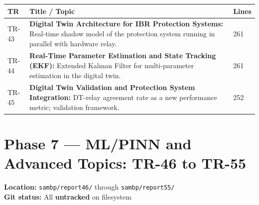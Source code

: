 \documentclass[11pt,a4paper]{article}
\begin{document}
\begin{longtable}{lp{9.5cm}l}
\toprule
\textbf{TR} & \textbf{Title / Topic} & \textbf{Lines} \\
\midrule
\endhead
TR-43 & \textbf{Digital Twin Architecture for IBR Protection Systems:} Real-time shadow model of the protection system running in parallel with hardware relay. & 261 \\[3pt]
TR-44 & \textbf{Real-Time Parameter Estimation and State Tracking (EKF):} Extended Kalman Filter for multi-parameter estimation in the digital twin. & 261 \\[3pt]
TR-45 & \textbf{Digital Twin Validation and Protection System Integration:} DT-relay agreement rate as a new performance metric; validation framework. & 252 \\[3pt]
\bottomrule
\end{longtable}

\section{Phase 7 — ML/PINN and Advanced Topics: TR-46 to TR-55}

\begin{phasebox}
\textbf{Location:} \texttt{sambp/report46/} through \texttt{sambp/report55/}\\
\textbf{Git status:} All \textcolor{untrackedorange}{\textbf{untracked}} on filesystem
\end{phasebox}
\end{document}
